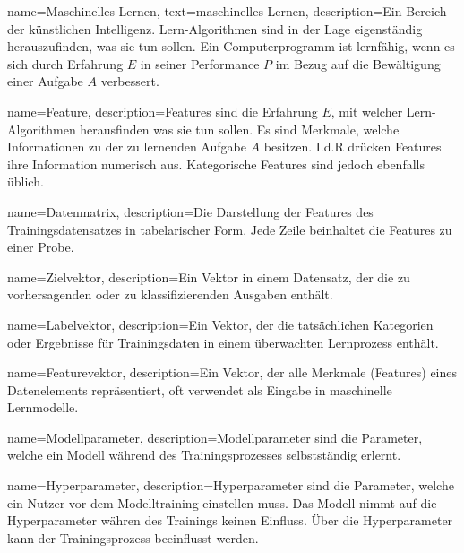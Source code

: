 
{
        name=Maschinelles Lernen,
        text=maschinelles Lernen,
        description={Ein Bereich der künstlichen Intelligenz. Lern-Algorithmen sind in der Lage eigenständig herauszufinden, was sie tun sollen. Ein Computerprogramm ist lernfähig, wenn es sich durch Erfahrung \(E\) in seiner Performance \(P\) im Bezug auf die Bewältigung einer Aufgabe \(A\) verbessert.}
} 

{
        name=Feature,
        description={Features sind die Erfahrung \(E\), mit welcher Lern-Algorithmen herausfinden was sie tun sollen. Es sind Merkmale, welche Informationen zu der zu lernenden Aufgabe \(A\) besitzen. I.d.R drücken Features ihre Information numerisch aus. Kategorische Features sind jedoch ebenfalls üblich.}
}

{
        name=Datenmatrix,
        description={Die Darstellung der Features des Trainingsdatensatzes in tabelarischer Form. Jede Zeile beinhaltet die Features zu einer Probe.}
}

{
        name=Zielvektor,
        description={Ein Vektor in einem Datensatz, der die zu vorhersagenden oder zu klassifizierenden Ausgaben enthält.}
}

{
        name=Labelvektor,
        description={Ein Vektor, der die tatsächlichen Kategorien oder Ergebnisse für Trainingsdaten in einem überwachten Lernprozess enthält.}
}

{
        name=Featurevektor,
        description={Ein Vektor, der alle Merkmale (Features) eines Datenelements repräsentiert, oft verwendet als Eingabe in maschinelle Lernmodelle.}
}

{
        name=Modellparameter,
        description={Modellparameter sind die Parameter, welche ein Modell während des Trainingsprozesses selbstständig erlernt.}
}


{
        name=Hyperparameter,
        description={Hyperparameter sind die Parameter, welche ein Nutzer vor dem Modelltraining einstellen muss. Das Modell nimmt auf die Hyperparameter währen des Trainings keinen Einfluss. Über die Hyperparameter kann der Trainingsprozess beeinflusst werden.}
}

